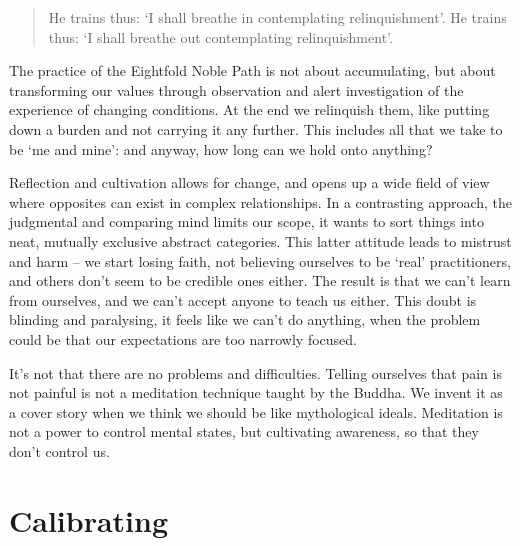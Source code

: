 \begin{quote}
He trains thus: `I shall breathe in contemplating relinquishment'. He
trains thus: `I shall breathe out contemplating relinquishment'.

\bigskip

\end{quote}

The practice of the Eightfold Noble Path is not about accumulating, but
about transforming our values through observation and alert
investigation of the experience of changing conditions. At the end we
relinquish them, like putting down a burden and not carrying it any
further. This includes all that we take to be `me and mine': and anyway,
how long can we hold onto anything?

\clearpage


Reflection and cultivation allows for change, and opens up a wide field
of view where opposites can exist in complex relationships. In a
contrasting approach, the judgmental and comparing mind limits our
scope, it wants to sort things into neat, mutually exclusive abstract
categories. This latter attitude leads to mistrust and harm -- we start
losing faith, not believing ourselves to be `real' practitioners, and
others don't seem to be credible ones either. The result is that we
can't learn from ourselves, and we can't accept anyone to teach us
either. This doubt is blinding and paralysing, it feels like we can't do
anything, when the problem could be that our expectations are too
narrowly focused.

It's not that there are no problems and difficulties. Telling ourselves
that pain is not painful is not a meditation technique taught by the
Buddha. We invent it as a cover story when we think we should be like
mythological ideals. Meditation is not a power to control mental states,
but cultivating awareness, so that they don't control us.

\clearpage

\section{Calibrating}


